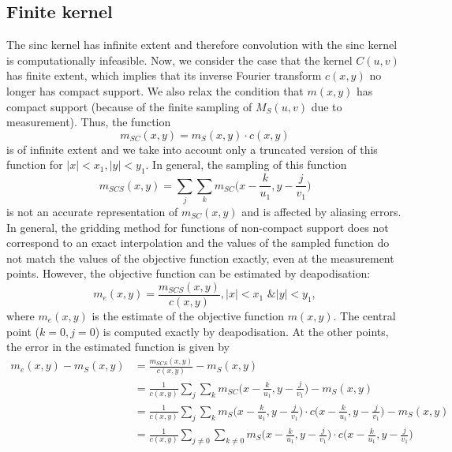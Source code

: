 \subsection{Finite kernel}
The sinc kernel has infinite extent and therefore convolution with the sinc kernel is computationally infeasible. Now, we consider the case that the kernel $C(u,v)$ has finite extent, which implies that its inverse Fourier transform $c(x,y)$ no longer has compact support. We also relax the condition that $m(x,y)$ has compact support (because of the finite sampling of $M_S(u,v)$ due to measurement). Thus, the function
\begin{equation}
m_{SC}(x,y) = m_S(x,y) \cdot c(x,y)
\end{equation}
is of infinite extent and we take into account only a truncated version of this function for $|x|<x_1, |y|<y_1$. In general, the sampling of this function
\begin{equation}
m_{SCS}(x,y) = \sum_j \sum_k m_{SC}\Bigg(x - \frac{k}{u_1}, y - \frac{j}{v_1} \Bigg)
\end{equation}
is not an accurate representation of $m_{SC}(x,y)$ and is affected by aliasing errors. In general, the gridding method for functions of non-compact support does not correspond to an exact interpolation and the values of the sampled function do not match the values of the objective function exactly, even at the measurement points. However, the objective function can be estimated by deapodisation:
\begin{equation}
m_e(x,y) = \frac{m_{SCS}(x,y)}{c(x,y)}, |x|<x_1 \text{ \& } |y|<y_1,
\end{equation}
where $m_e(x,y)$ is the estimate of the objective function $m(x,y)$. The central point ($k=0, j=0$) is computed exactly by deapodisation. At the other points, the error in the estimated function is given by
\begin{align}
m_e(x,y) - m_{S}(x,y) &= \frac{m_{SCS}(x,y)}{c(x,y)} - m_{S}(x,y) \\
&= \frac{1}{c(x,y)}\sum_j \sum_k m_{SC}\Bigg(x - \frac{k}{u_1}, y - \frac{j}{v_1} \Bigg) - m_S(x,y)\\
&= \frac{1}{c(x,y)}\sum_j \sum_k m_{S}\Bigg(x - \frac{k}{u_1}, y - \frac{j}{v_1} \Bigg) \cdot c\Bigg( x - \frac{k}{u_1}, y - \frac{j}{v_1}\Bigg) - m_S(x,y) \\
&= \frac{1}{c(x,y)}\sum_{j\neq0} \sum_{k\neq0} m_{S}\Bigg(x - \frac{k}{u_1}, y - \frac{j}{v_1} \Bigg) \cdot c\Bigg( x - \frac{k}{u_1}, y - \frac{j}{v_1}\Bigg)
\end{align}


